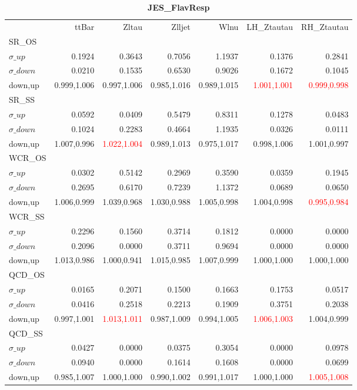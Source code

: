 \documentclass[11pt,oneside,a4paper]{article}
\begin{document}
\begin{table}
\centering
\caption{\bf{JES\_FlavResp}}
\begin{tabular}{lrrrrrr}
 & ttBar & Zltau & Zlljet & Wlnu & LH\_Ztautau & RH\_Ztautau \\
SR\_OS &  &  &  &  &  &  \\
$\sigma\_up$ & 0.1924 & 0.3643 & 0.7056 & 1.1937 & 0.1376 & 0.2841 \\
$\sigma\_down$ & 0.0210 & 0.1535 & 0.6530 & 0.9026 & 0.1672 & 0.1045 \\
down,up & 0.999,1.006 & 0.997,1.006 & 0.985,1.016 & 0.989,1.015 & \textcolor{red}{1.001,1.001} & \textcolor{red}{0.999,0.998} \\

\hline
SR\_SS &  &  &  &  &  &  \\
$\sigma\_up$ & 0.0592 & 0.0409 & 0.5479 & 0.8311 & 0.1278 & 0.0483 \\
$\sigma\_down$ & 0.1024 & 0.2283 & 0.4664 & 1.1935 & 0.0326 & 0.0111 \\
down,up & 1.007,0.996 & \textcolor{red}{1.022,1.004} & 0.989,1.013 & 0.975,1.017 & 0.998,1.006 & 1.001,0.997 \\

\hline
WCR\_OS &  &  &  &  &  &  \\
$\sigma\_up$ & 0.0302 & 0.5142 & 0.2969 & 0.3590 & 0.0359 & 0.1945 \\
$\sigma\_down$ & 0.2695 & 0.6170 & 0.7239 & 1.1372 & 0.0689 & 0.0650 \\
down,up & 1.006,0.999 & 1.039,0.968 & 1.030,0.988 & 1.005,0.998 & 1.004,0.998 & \textcolor{red}{0.995,0.984} \\

\hline
WCR\_SS &  &  &  &  &  &  \\
$\sigma\_up$ & 0.2296 & 0.1560 & 0.3714 & 0.1812 & 0.0000 & 0.0000 \\
$\sigma\_down$ & 0.2096 & 0.0000 & 0.3711 & 0.9694 & 0.0000 & 0.0000 \\
down,up & 1.013,0.986 & 1.000,0.941 & 1.015,0.985 & 1.007,0.999 & 1.000,1.000 & 1.000,1.000 \\

\hline
QCD\_OS &  &  &  &  &  &  \\
$\sigma\_up$ & 0.0165 & 0.2071 & 0.1500 & 0.1663 & 0.1753 & 0.0517 \\
$\sigma\_down$ & 0.0416 & 0.2518 & 0.2213 & 0.1909 & 0.3751 & 0.2038 \\
down,up & 0.997,1.001 & \textcolor{red}{1.013,1.011} & 0.987,1.009 & 0.994,1.005 & \textcolor{red}{1.006,1.003} & 1.004,0.999 \\

\hline
QCD\_SS &  &  &  &  &  &  \\
$\sigma\_up$ & 0.0427 & 0.0000 & 0.0375 & 0.3054 & 0.0000 & 0.0978 \\
$\sigma\_down$ & 0.0940 & 0.0000 & 0.1614 & 0.1608 & 0.0000 & 0.0699 \\
down,up & 0.985,1.007 & 1.000,1.000 & 0.990,1.002 & 0.991,1.017 & 1.000,1.000 & \textcolor{red}{1.005,1.008} \\

\hline
\end{tabular}
\end{table}
\end{document}
